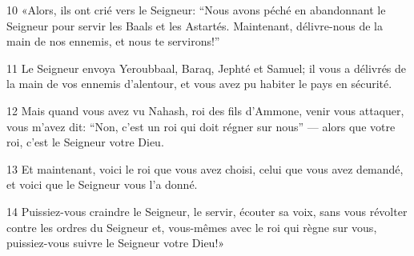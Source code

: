 
10 «Alors, ils ont crié vers le Seigneur: “Nous avons péché en abandonnant le Seigneur pour servir les Baals et les Astartés. Maintenant, délivre-nous de la main de nos ennemis, et nous te servirons!”

11 Le Seigneur envoya Yeroubbaal, Baraq, Jephté et Samuel; il vous a délivrés de la main de vos ennemis d’alentour, et vous avez pu habiter le pays en sécurité.

12 Mais quand vous avez vu Nahash, roi des fils d’Ammone, venir vous attaquer, vous m’avez dit: “Non, c’est un roi qui doit régner sur nous” --- alors que votre roi, c’est le Seigneur votre Dieu.

13 Et maintenant, voici le roi que vous avez choisi, celui que vous avez demandé, et voici que le Seigneur vous l’a donné.

14 Puissiez-vous craindre le Seigneur, le servir, écouter sa voix, sans vous révolter contre les ordres du Seigneur et, vous-mêmes avec le roi qui règne sur vous, puissiez-vous suivre le Seigneur votre Dieu!»